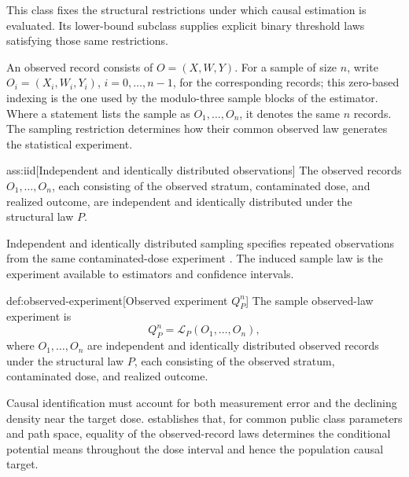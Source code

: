 \documentclass[11pt]{article}
\begin{document}
This class fixes the structural restrictions under which causal estimation is evaluated. Its lower-bound subclass supplies explicit binary threshold laws satisfying those same restrictions.

An observed record  consists of \(O=(X,W,Y)\). For a sample of size \(n\), write \(O_i=(X_i,W_i,Y_i)\), \(i=0,\ldots,n-1\), for the corresponding records; this zero-based indexing is the one used by the modulo-three sample blocks of the estimator. Where a statement lists the sample as \(O_1,\ldots,O_n\), it denotes the same \(n\) records. The sampling restriction determines how their common observed law generates the statistical experiment.

\begin{assumptionv}{ass:iid}[Independent and identically distributed observations]
The observed records \(O_1,\ldots,O_n\), each consisting of the observed stratum, contaminated dose, and realized outcome, are independent and identically distributed under the structural law \(P\).
\end{assumptionv}

Independent and identically distributed sampling specifies repeated observations from the same contaminated-dose experiment \citep{HuangZhang2023}. The induced sample law  is the experiment available to estimators and confidence intervals.

\begin{definitionv}{def:observed-experiment}[Observed experiment \(Q_P^n\)]
The sample observed-law experiment is
\[
Q_P^n=\mathcal L_P(O_1,\ldots,O_n),
\]
where \(O_1,\ldots,O_n\) are independent and identically distributed observed records under the structural law \(P\), each consisting of the observed stratum, contaminated dose, and realized outcome.
\end{definitionv}

Causal identification must account for both measurement error and the declining density near the target dose.  establishes that, for common public class parameters and path space, equality of the observed-record laws determines the conditional potential means throughout the dose interval and hence the population causal target.
\end{document}
